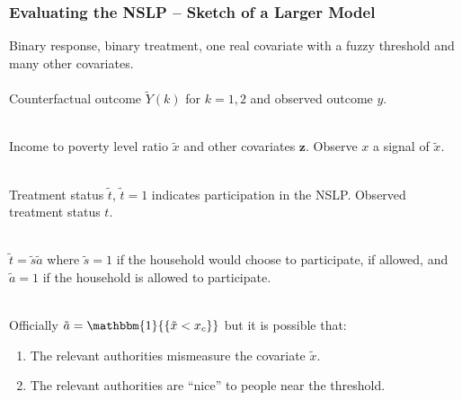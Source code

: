 \documentclass[xcolor=dvipsnames]{beamer}
\newcommand{\indicator}[1]{\mathbbm{1}{\left\{ {#1} \right\} }}
\begin{document}
\begin{frame}
\frametitle{Evaluating the NSLP -- Sketch of a Larger Model}
 Binary response, binary treatment, one real covariate with a
fuzzy threshold and many other covariates.\\~\\

\pause Counterfactual outcome $\tilde{Y}(k)$ for $k=1,2$ and observed outcome $y$.\\~

\pause Income to poverty level ratio $\tilde{x}$ and other covariates $\bm{z}$. Observe $x$ a signal of $\tilde{x}$.\\~

\pause Treatment status $\tilde{t}$, $\tilde{t}=1$ indicates participation in the NSLP. Observed treatment status $t$.\\~

\pause $\tilde{t}=\tilde{s}\tilde{a}$ where $\tilde{s}=1$ if the household would choose to participate, if allowed, and $\tilde{a}=1$ if the household is allowed to participate.\\~

\pause Officially $\tilde{a}=\indicator{\tilde{x}<x_c}$ but it is possible that:
\begin{enumerate}
\item The relevant authorities mismeasure the covariate
  $\tilde{x}$.
\item The relevant authorities are ``nice'' to people near the
  threshold.
\end{enumerate}

\end{frame}
\end{document}
